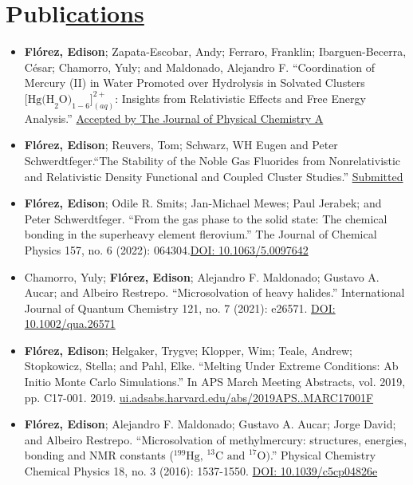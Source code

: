 \section{Publi\href{.}{cations}}

\begin{itemize}
    \small

    \item \textbf{Flórez, Edison}; Zapata-Escobar, Andy; Ferraro, Franklin; Ibarguen-Becerra, César; Chamorro, Yuly; and Maldonado, Alejandro F. ``Coordination of Mercury (II) in Water Promoted over Hydrolysis in Solvated Clusters $\text{[Hg(H}_2\text{O)}_{1-6}\text{]}^{2+}_{(aq)}$: Insights from Relativistic Effects and Free Energy Analysis.'' \href{.}{Accepted by The Journal of Physical Chemistry A}

    \item \textbf{Flórez, Edison}; Reuvers, Tom; Schwarz, WH Eugen and Peter Schwerdtfeger.``The Stability of the Noble Gas Fluorides from Nonrelativistic and Relativistic Density Functional and Coupled Cluster Studies.'' \href{.}{Submitted}

    \item \textbf{Flórez, Edison}; Odile R. Smits; Jan-Michael Mewes; Paul Jerabek; and Peter Schwerdtfeger. ``From the gas phase to the solid state: The chemical bonding in the superheavy element flerovium.'' The Journal of Chemical Physics 157, no. 6 (2022): 064304.\href{https://www.doi.org/10.1063/5.0097642}{DOI: 10.1063/5.0097642}

    \item Chamorro, Yuly;  \textbf{Flórez, Edison}; Alejandro F. Maldonado; Gustavo A. Aucar; and Albeiro Restrepo. ``Microsolvation of heavy halides.'' International Journal of Quantum Chemistry 121, no. 7 (2021): e26571. \href{https://www.doi.org/10.1002/qua.26571}{DOI: 10.1002/qua.26571}

    \item \textbf{Flórez, Edison}; Helgaker, Trygve; Klopper, Wim; Teale, Andrew; Stopkowicz, Stella; and Pahl, Elke. ``Melting Under Extreme Conditions: Ab Initio Monte Carlo Simulations.'' In APS March Meeting Abstracts, vol. 2019, pp. C17-001. 2019. \href{https://ui.adsabs.harvard.edu/abs/2019APS..MARC17001F/abstract}{ui.adsabs.harvard.edu/abs/2019APS..MARC17001F}

    \item \textbf{Flórez, Edison}; Alejandro F. Maldonado; Gustavo A. Aucar; Jorge David; and Albeiro Restrepo. ``Microsolvation of methylmercury: structures, energies, bonding and NMR constants ($^{199}\text{Hg, }^{13}\text{C and }^{17}\text{O)}$.'' Physical Chemistry Chemical Physics 18, no. 3 (2016): 1537-1550. \href{https://www.doi.org/10.1039/c5cp04826e}{DOI: 10.1039/c5cp04826e}

\end{itemize}


